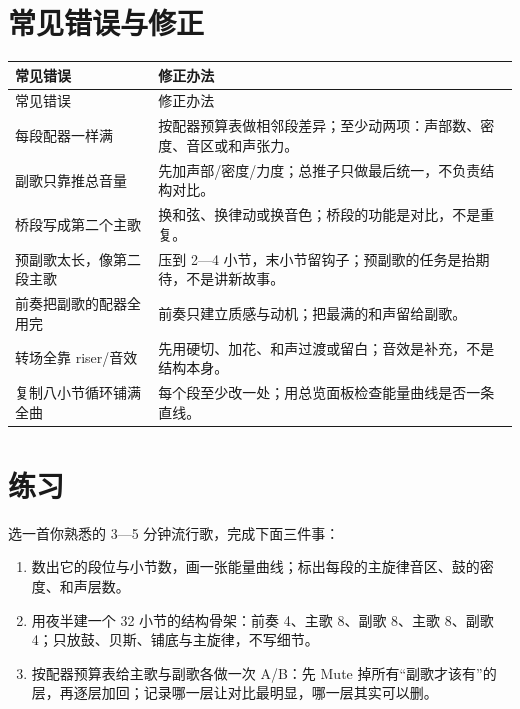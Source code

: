 
\section{常见错误与修正}
\label{sec:structure-mistakes}

\begin{longtable}{p{}p{}}
\toprule
常见错误 & 修正办法 \\
\midrule
\endfirsthead
\toprule
常见错误 & 修正办法 \\
\midrule
\endhead
每段配器一样满 & 按配器预算表做相邻段差异；至少动两项：声部数、密度、音区或和声张力。 \\
副歌只靠推总音量 & 先加声部/密度/力度；总推子只做最后统一，不负责结构对比。 \\
桥段写成第二个主歌 & 换和弦、换律动或换音色；桥段的功能是对比，不是重复。 \\
预副歌太长，像第二段主歌 & 压到 2—4 小节，末小节留钩子；预副歌的任务是抬期待，不是讲新故事。 \\
前奏把副歌的配器全用完 & 前奏只建立质感与动机；把最满的和声留给副歌。 \\
转场全靠 riser/音效 & 先用硬切、加花、和声过渡或留白；音效是补充，不是结构本身。 \\
复制八小节循环铺满全曲 & 每个段至少改一处；用总览面板检查能量曲线是否一条直线。 \\
\bottomrule
\end{longtable}

\section{练习}
\label{sec:structure-exercise}

\begin{exercise}
选一首你熟悉的 3—5 分钟流行歌，完成下面三件事：
\begin{enumerate}
\item 数出它的段位与小节数，画一张能量曲线；标出每段的主旋律音区、鼓的密度、和声层数。
\item 用夜半建一个 32 小节的结构骨架：前奏 4、主歌 8、副歌 8、主歌 8、副歌 4；只放鼓、贝斯、铺底与主旋律，不写细节。
\item 按配器预算表给主歌与副歌各做一次 A/B：先 Mute 掉所有“副歌才该有”的层，再逐层加回；记录哪一层让对比最明显，哪一层其实可以删。
\end{enumerate}
\end{exercise}


